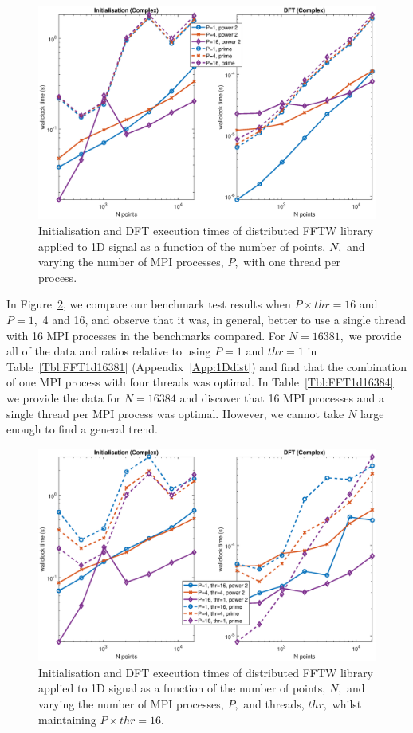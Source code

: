 \documentclass[a4paper]{article}
\begin{document}
\begin{figure}[htb]
    \centering
    \includegraphics[width=0.9\linewidth]{../results/fftw_1d_mpi.eps}
  \caption{Initialisation and DFT execution times of distributed FFTW library applied to 1D signal as a function of the
    number of points, $N,$ and varying the number of MPI processes, $P,$ with one thread per process.}
  \label{1DDistFFTW}
\end{figure}

In Figure~\ref{1DDistFFTW16}, we compare our benchmark test results
when $P\times thr=16$ and $P=1,$ 4 and 16, and observe that it was, in
general, better to use a single thread with 16 MPI processes in the
benchmarks compared. For $N=16381,$ we provide all of the data and
ratios relative to using $P=1$ and $thr=1$ in
Table~\ref{Tbl:FFT1d16381} (Appendix~\ref{App:1Ddist}) and find that the combination of one MPI
process with four threads was optimal. In Table~\ref{Tbl:FFT1d16384}
we provide the data for $N=16384$ and discover that 16 MPI processes
and a single thread per MPI process was optimal. However, we cannot
take $N$ large enough to find a general trend.

\begin{figure}[htb]
    \centering
    \includegraphics[width=0.9\linewidth]{../results/fftw_1d_mpi_thr.eps}
  \caption{Initialisation and DFT execution times of distributed FFTW library applied to 1D signal as a function of the
    number of points, $N,$ and varying the number of MPI processes, $P,$ and threads, $thr,$ whilst maintaining $P\times thr=16.$}
  \label{1DDistFFTW16}
\end{figure}
\end{document}
